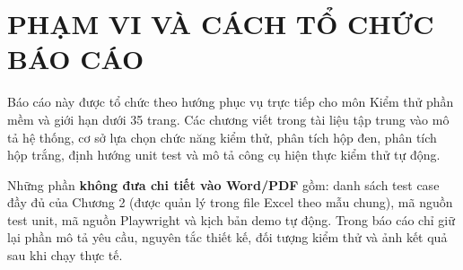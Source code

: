 
\newpage
{}
{}
\section*{\textbf{PHẠM VI VÀ CÁCH TỔ CHỨC BÁO CÁO}}

Báo cáo này được tổ chức theo hướng phục vụ trực tiếp cho môn Kiểm thử phần mềm và giới hạn dưới 35 trang. Các chương viết trong tài liệu tập trung vào mô tả hệ thống, cơ sở lựa chọn chức năng kiểm thử, phân tích hộp đen, phân tích hộp trắng, định hướng unit test và mô tả công cụ hiện thực kiểm thử tự động.

Những phần \textbf{không đưa chi tiết vào Word/PDF} gồm: danh sách test case đầy đủ của Chương 2 (được quản lý trong file Excel theo mẫu chung), mã nguồn test unit, mã nguồn Playwright và kịch bản demo tự động. Trong báo cáo chỉ giữ lại phần mô tả yêu cầu, nguyên tắc thiết kế, đối tượng kiểm thử và ảnh kết quả sau khi chạy thực tế.
